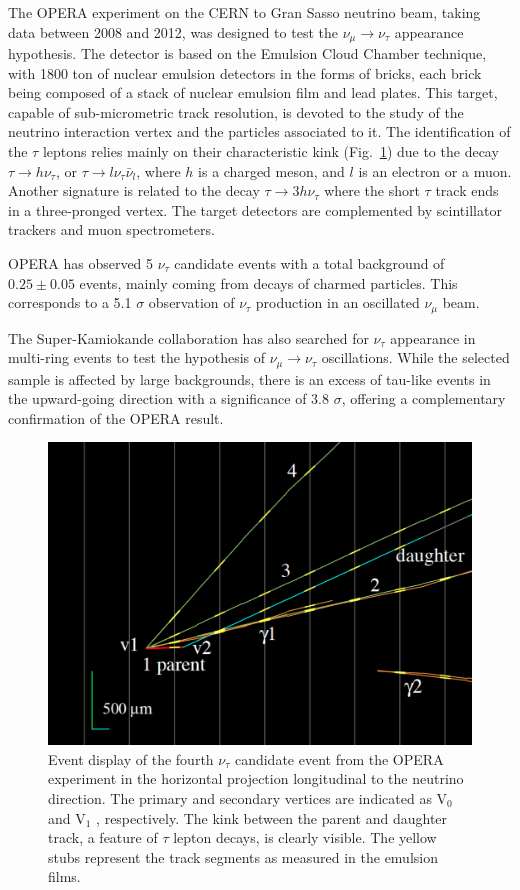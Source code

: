 \documentclass[preprint,12pt]{elsarticle}
\begin{document}
The OPERA experiment on the CERN to Gran Sasso neutrino beam, taking data between 2008 and 2012, was designed to test the $\nu_\mu \rightarrow \nu_\tau$ appearance hypothesis. The detector is based on the Emulsion Cloud Chamber technique, with 1800 ton of nuclear emulsion detectors in the forms of bricks, each brick being composed of a stack of nuclear emulsion film and lead plates. This target, capable of sub-micrometric track resolution, is devoted to the study of the neutrino interaction vertex and the particles associated to it. The identification of the $\tau$ leptons relies mainly on their characteristic kink (Fig.~\ref{fig:opera}) due to the decay $\tau \rightarrow h \nu_\tau$, or $\tau \rightarrow l \nu_\tau \bar \nu_l$, where $h$ is a charged meson, and $l$ is an electron or a muon. Another signature is related to the decay $\tau \rightarrow 3 h \nu_\tau$ where the short $\tau$ track ends in a three-pronged vertex. The target detectors are complemented by scintillator trackers and muon spectrometers. 

OPERA has observed 5 $\nu_\tau$ candidate events \cite{ref:opera} with a total background of 
$0.25 \pm 0.05$ events, mainly coming from decays of charmed particles. This corresponds to a 5.1 $\sigma$ observation of $\nu_\tau$ production in an oscillated $\nu_\mu$ beam. 

The Super-Kamiokande collaboration has also searched for $\nu_\tau$ appearance in multi-ring events to test the hypothesis of $\nu_\mu \rightarrow \nu_\tau$ oscillations. While the selected sample is affected by large backgrounds, there is an excess of tau-like events in the upward-going direction with a significance of 3.8 $\sigma$, offering a complementary confirmation of the OPERA result.  
 
\begin{figure}[htbp]
\centering
\includegraphics[width=0.6\linewidth]{figures/tau4.pdf}
  \caption{
Event display of the fourth $\nu_\tau$ candidate event from the OPERA 
experiment\cite{ref:opera2} in the
horizontal projection longitudinal to the neutrino direction.
The primary and secondary vertices are indicated as V$_0$ and
V$_1$ , respectively. The kink between the parent and daughter track, a feature of $\tau$ lepton decays, is clearly visible. The yellow stubs represent the track segments as measured in the emulsion films.  
}
 \label{fig:opera}
 \end{figure}
\end{document}
